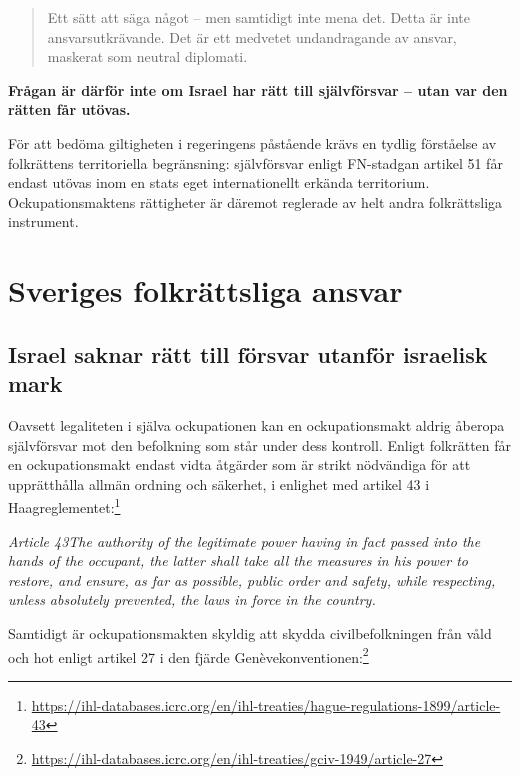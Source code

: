 \documentclass[12pt]{article}
\newcommand{\lagrum}[1]{\par\vspace{3mm}\textit{#1}\par\vspace{5mm}}
\begin{document}
\begin{quote}
Ett sätt att säga något – men samtidigt inte mena det.  
Detta är inte ansvarsutkrävande. Det är ett medvetet undandragande av ansvar, maskerat som neutral diplomati.
\end{quote}

\medskip

\textbf{Frågan är därför inte om Israel har rätt till självförsvar – utan var den rätten får utövas.}

För att bedöma giltigheten i regeringens påstående krävs en tydlig förståelse av folkrättens territoriella begränsning: självförsvar enligt FN-stadgan artikel 51 får endast utövas inom en stats eget internationellt erkända territorium. Ockupationsmaktens rättigheter är däremot reglerade av helt andra folkrättsliga instrument.


\section{Sveriges folkrättsliga ansvar}

\subsection*{Israel saknar rätt till försvar utanför israelisk mark}

Oavsett legaliteten i själva ockupationen kan en ockupationsmakt aldrig åberopa självförsvar mot den befolkning som står under dess kontroll. Enligt folkrätten får en ockupationsmakt endast vidta åtgärder som är strikt nödvändiga för att upprätthålla allmän ordning och säkerhet, i enlighet med artikel 43 i Haagreglementet:\footnote{\url{https://ihl-databases.icrc.org/en/ihl-treaties/hague-regulations-1899/article-43}}

\lagrum{Article 43\quad The authority of the legitimate power having in fact passed into the hands of the occupant, the latter shall take all the measures in his power to restore, and ensure, as far as possible, public order and safety, while respecting, unless absolutely prevented, the laws in force in the country.}

Samtidigt är ockupationsmakten skyldig att skydda civilbefolkningen från våld och hot enligt artikel 27 i den fjärde Genèvekonventionen:\footnote{\url{https://ihl-databases.icrc.org/en/ihl-treaties/gciv-1949/article-27}}
\end{document}
